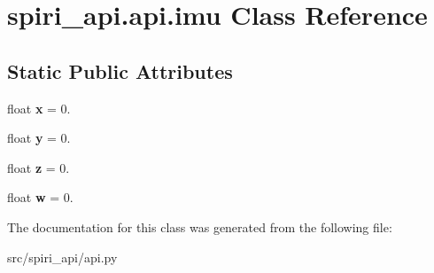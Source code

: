 \hypertarget{classspiri__api_1_1api_1_1imu}{\section{spiri\-\_\-api.\-api.\-imu \-Class \-Reference}
\label{classspiri__api_1_1api_1_1imu}
}
\subsection*{\-Static \-Public \-Attributes}
\begin{DoxyCompactItemize}
\item 
\hypertarget{classspiri__api_1_1api_1_1imu_a0f3884106348a9e6a3df3e8aa56de880}{float {\bfseries x} = 0.}\label{classspiri__api_1_1api_1_1imu_a0f3884106348a9e6a3df3e8aa56de880}

\item 
\hypertarget{classspiri__api_1_1api_1_1imu_a4857c72467dc8e9935be6e98760df4b6}{float {\bfseries y} = 0.}\label{classspiri__api_1_1api_1_1imu_a4857c72467dc8e9935be6e98760df4b6}

\item 
\hypertarget{classspiri__api_1_1api_1_1imu_a69c299e168934903265f64219386062d}{float {\bfseries z} = 0.}\label{classspiri__api_1_1api_1_1imu_a69c299e168934903265f64219386062d}

\item 
\hypertarget{classspiri__api_1_1api_1_1imu_ac912479a145bb15c4fbdfceb2778babf}{float {\bfseries w} = 0.}\label{classspiri__api_1_1api_1_1imu_ac912479a145bb15c4fbdfceb2778babf}

\end{DoxyCompactItemize}


\-The documentation for this class was generated from the following file\-:\begin{DoxyCompactItemize}
\item 
src/spiri\-\_\-api/api.\-py\end{DoxyCompactItemize}
